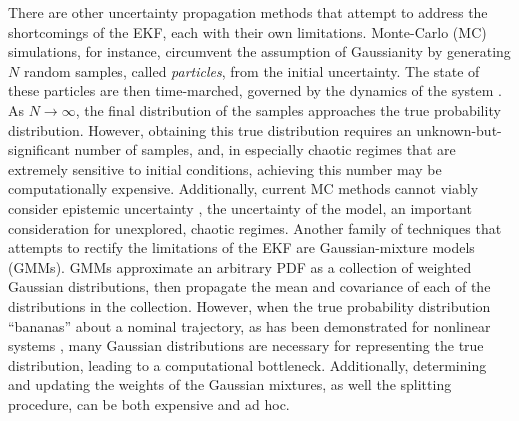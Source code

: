 \documentclass[paper,11pt]{AAS}
\begin{document}
There are other uncertainty propagation methods that attempt to address the shortcomings of the EKF, each with their own limitations. Monte-Carlo (MC) simulations, for instance, circumvent the assumption of Gaussianity by generating $N$ random samples, called \textit{particles}, from the initial uncertainty. The state of these particles are then time-marched, governed by the dynamics of the system \cite{yL17}. As $N\rightarrow \infty$, the final distribution of the samples approaches the true probability distribution. However, obtaining this true distribution requires an unknown-but-significant number of samples, and, in especially chaotic regimes that are extremely sensitive to initial conditions, achieving this number may be computationally expensive. Additionally, current MC methods cannot viably consider epistemic uncertainty \cite{TR15}, the uncertainty of the model, an important consideration for unexplored, chaotic regimes. Another family of techniques that attempts to rectify the limitations of the EKF are Gaussian-mixture models\cite{yL17} (GMMs). GMMs approximate an arbitrary PDF as a collection of weighted Gaussian distributions, then propagate the mean and covariance of each of the distributions in the collection. However, when the true probability distribution ``bananas'' about a nominal trajectory, as has been demonstrated for nonlinear systems \cite{kF12}, many Gaussian distributions are necessary for representing the true distribution, leading to a computational bottleneck. Additionally, determining and updating the weights of the Gaussian mixtures, as well the splitting procedure, can be both expensive and ad hoc.
\end{document}
